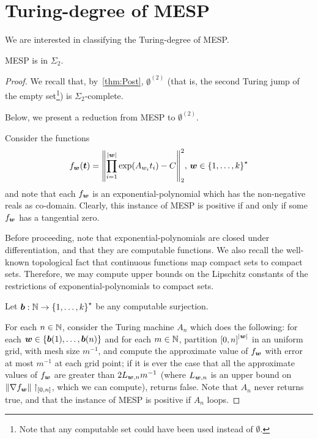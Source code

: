 \section{Turing-degree of MESP}
\label{sec:turing-degree-lics}

We are interested in classifying the Turing-degree of MESP\@.

\begin{theorem}
\label{thm:turing-degree-2}
  MESP is in $\Sigma_{2}$.
\end{theorem}

\begin{proof}
We recall that, by~\cref{thm:Post}, $\emptyset^{(2)}$ (that is, the second Turing jump of the empty set\footnote{Note that any computable set could have been used instead of $\emptyset$.}) is $\Sigma_{2}$-complete.

Below, we present a reduction from MESP to $\emptyset^{(2)}$.

Consider the functions
\begin{equation*}
    f_{\boldsymbol{w}}(\boldsymbol{t}) = {\left \| \prod \limits_{i=1}^{\lvert \boldsymbol{w} \rvert} \exp(A_{w_{i}} t_{i}) - C \right \|}_{2}^{2}, \, \boldsymbol{w} \in {\lbrace 1, \ldots, k \rbrace}^{\star}
\end{equation*}
and note that each $f_{\boldsymbol{w}}$ is an exponential-polynomial which has the non-negative reals as co-domain. Clearly, this instance of MESP is positive if and only if some $f_{\boldsymbol{w}}$ has a tangential zero.

Before proceeding, note that exponential-polynomials are closed under differentiation, and that they are computable functions. We also recall the well-known topological fact that continuous functions map compact sets to compact sets. Therefore, we may compute upper bounds on the Lipschitz constants of the restrictions of exponential-polynomials to compact sets.

Let $\boldsymbol{b} : \mathbb{N} \rightarrow {\lbrace 1, \ldots, k \rbrace}^{\star}$ be any computable surjection.

For each $n \in \mathbb{N}$, consider the Turing machine $A_{n}$ which does the following:
for each $\boldsymbol{w} \in \lbrace \boldsymbol{b}(1), \ldots, \boldsymbol{b}(n) \rbrace$ and for each $m \in \mathbb{N}$, partition ${[0,n]}^{\lvert \boldsymbol{w} \rvert}$ in an uniform grid, with mesh size $m^{-1}$, and compute the approximate value of $f_{\boldsymbol{w}}$ with error at most $m^{-1}$ at each grid point;
if it is ever the case that all the approximate values of $f_{\boldsymbol{w}}$ are greater than $2 L_{\boldsymbol{w}, n} m^{-1}$ (where $L_{\boldsymbol{w}, n}$ is an upper bound on ${\| \nabla f_{\boldsymbol{w}} \|}\restriction_{[0,n]}$, which we can compute), returns false. Note that $A_{n}$ never returns true, and that the instance of MESP is positive if $A_{n}$ loops.


\end{proof}
